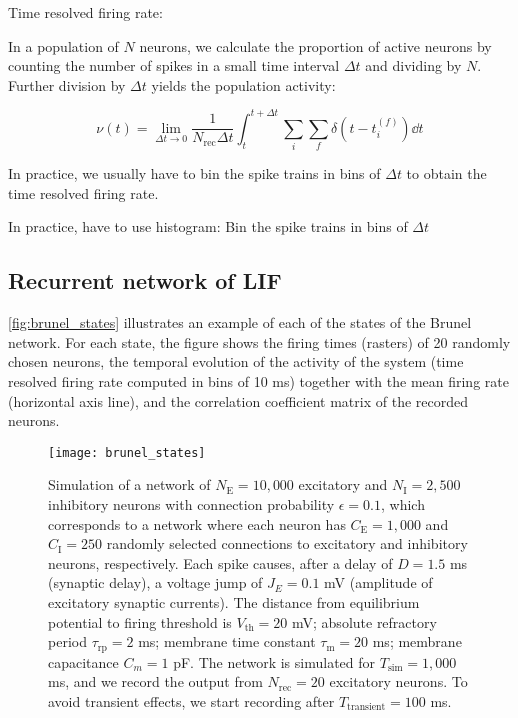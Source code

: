 Time resolved firing rate: 

In a population of $N$ neurons, we calculate the proportion of active neurons by counting the number of spikes in a small time interval $\Delta t$ and dividing by $N$. Further division by $\Delta t$ yields the population activity:

\begin{equation}
    \nu (t) = \lim_{\Delta t \to 0} \frac{1}{N_\mathrm{rec} \Delta t} \int_{t}^{t + \Delta t} \sum_i \sum_f \delta \left(t - t_i^{(f)} \right) \dd{t}
\end{equation} 

In practice, we usually have to bin the spike trains in bins of $\Delta t$ to obtain the time resolved firing rate. 

In practice, have to use histogram: Bin the spike trains in bins of $\Delta t$

\subsection{Recurrent network of LIF}


\autoref{fig:brunel_states} illustrates an example of each of the states of the Brunel network. For each state, the figure shows the firing times (rasters) of 20 randomly chosen neurons, the temporal evolution of the activity of the system (time resolved firing rate computed in bins of 10 ms) together with the mean firing rate (horizontal axis line), and the correlation coefficient matrix of the recorded neurons.


\begin{figure}[H]
    \centering
    \texttt{[image: brunel\_states]}
    \caption{Simulation of a network of $N_\mathrm{E}=10,000$ excitatory and $N_\mathrm{I} = 2,500$ inhibitory neurons with connection probability $\epsilon = 0.1$, which corresponds to a network where each neuron has $C_\mathrm{E}=1,000$ and $C_\mathrm{I}=250$ randomly selected connections to excitatory and inhibitory neurons, respectively. Each spike causes, after a delay of $D=1.5$ ms (synaptic delay), a voltage jump of $J_E = 0.1$ mV (amplitude of excitatory synaptic currents). The distance from equilibrium potential to firing threshold is $V_\mathrm{th} = 20$ mV; absolute refractory period $\tau_\mathrm{rp} = 2$ ms; membrane time constant $\tau_\mathrm{m}=20$ ms; membrane capacitance $C_m = 1$ pF. The network is simulated for $T_\mathrm{sim} = 1,000$ ms, and we record the output from $N_\mathrm{rec} = 20$ excitatory neurons. To avoid transient effects, we start recording after $T_\mathrm{transient} = 100$ ms. 
    }
    \label{fig:brunel_states}
\end{figure}


